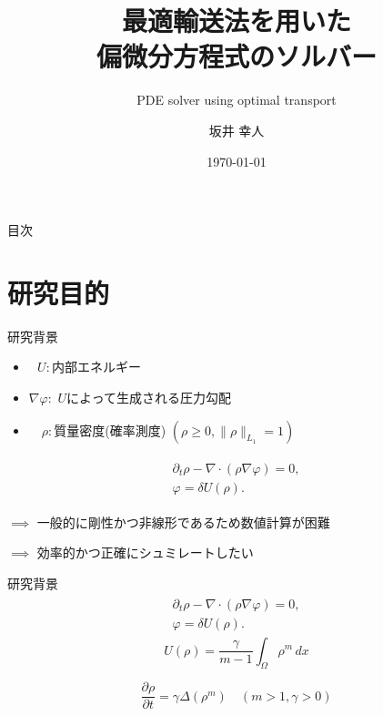 \documentclass[dvipdfmx, 12pt]{beamer}
\title{最適輸送法を用いた\\偏微分方程式のソルバー}
\subtitle{PDE solver using optimal transport}
\author[坂井 幸人]{坂井 幸人}
\institute[数物科学専攻 2年]{数物科学専攻 2年}
\date{\today}
\begin{document}
\frame{\maketitle}


\begin{frame}{目次}
    \tableofcontents
\end{frame}


\section{研究目的}
\begin{frame}{研究背景}
    \begin{itemize}
        \item $\,\,\,\, U: $内部エネルギー
        \item $\nabla \varphi: $ $U$によって生成される圧力勾配
        \item $\,\,\,\,\, \, \rho: $質量密度(確率測度) $(\rho \ge 0, \|\rho\|_{L_1} = 1)$
    \end{itemize}

    \begin{align*}
        \begin{split}
            \partial_t \rho - \nabla \cdot (\rho \nabla \varphi) = 0, \\
            \varphi = \delta U(\rho).
        \end{split}
    \end{align*}


    \vspace\baselineskip 
    $\implies $ 一般的に剛性かつ非線形であるため数値計算が困難

    \vspace\baselineskip 
    $\implies $ 効率的かつ正確にシュミレートしたい
    

\end{frame}

\begin{frame}{研究背景}
    \begin{align*}
        \begin{split}
            \partial_t \rho - \nabla \cdot (\rho \nabla \varphi) = 0, \\
            \varphi = \delta U(\rho).
        \end{split}
    \end{align*}
    \[
        U(\rho) = \frac{\gamma}{m-1} \int_{\Omega} \rho^m \,dx
    \]

    \[
        \frac{\partial \rho}{\partial t} = \gamma \Delta(\rho^m) \quad (m > 1, \gamma > 0)
    \]
\end{frame}
\end{document}

